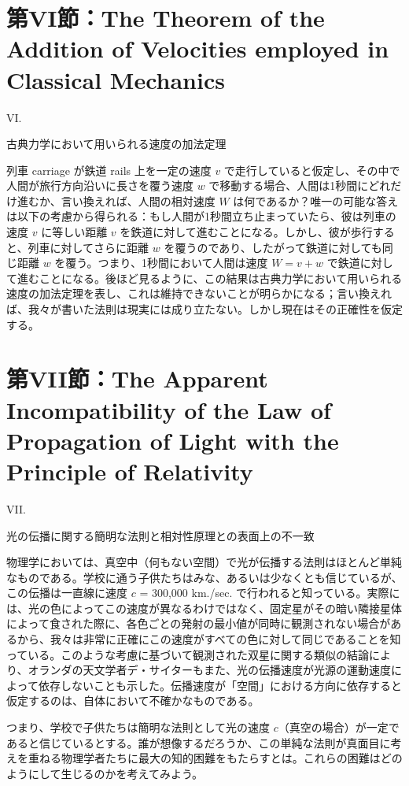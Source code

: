 \documentclass[a4paper,11pt,openany]{ltjsbook}
\begin{document}
\clearpage
\chapter{第VI節：The Theorem of the Addition of Velocities employed in Classical Mechanics}

VI.

古典力学において用いられる速度の加法定理

列車 carriage が鉄道 rails 上を一定の速度 $v$ で走行していると仮定し、その中で人間が旅行方向沿いに長さを覆う速度 $w$ で移動する場合、人間は1秒間にどれだけ進むか、言い換えれば、人間の相対速度 $W$ は何であるか？唯一の可能な答えは以下の考慮から得られる：もし人間が1秒間立ち止まっていたら、彼は列車の速度 $v$ に等しい距離 $v$ を鉄道に対して進むことになる。しかし、彼が歩行すると、列車に対してさらに距離 $w$ を覆うのであり、したがって鉄道に対しても同じ距離 $w$ を覆う。つまり、1秒間において人間は速度 $W = v + w$ で鉄道に対して進むことになる。後ほど見るように、この結果は古典力学において用いられる速度の加法定理を表し、これは維持できないことが明らかになる；言い換えれば、我々が書いた法則は現実には成り立たない。しかし現在はその正確性を仮定する。


\clearpage
\chapter{第VII節：The Apparent Incompatibility of the Law of Propagation of Light with the Principle of Relativity}

VII.

光の伝播に関する簡明な法則と相対性原理との表面上の不一致

物理学においては、真空中（何もない空間）で光が伝播する法則はほとんど単純なものである。学校に通う子供たちはみな、あるいは少なくとも信じているが、この伝播は一直線に速度 $c$ = 300,000 km./sec. で行われると知っている。実際には、光の色によってこの速度が異なるわけではなく、固定星がその暗い隣接星体によって食された際に、各色ごとの発射の最小値が同時に観測されない場合があるから、我々は非常に正確にこの速度がすべての色に対して同じであることを知っている。このような考慮に基づいて観測された双星に関する類似の結論により、オランダの天文学者デ・サイターもまた、光の伝播速度が光源の運動速度によって依存しないことも示した。伝播速度が「空間」における方向に依存すると仮定するのは、自体において不確かなものである。

つまり、学校で子供たちは簡明な法則として光の速度 $c$（真空の場合）が一定であると信じているとする。誰が想像するだろうか、この単純な法則が真面目に考えを重ねる物理学者たちに最大の知的困難をもたらすとは。これらの困難はどのようにして生じるのかを考えてみよう。
\end{document}

